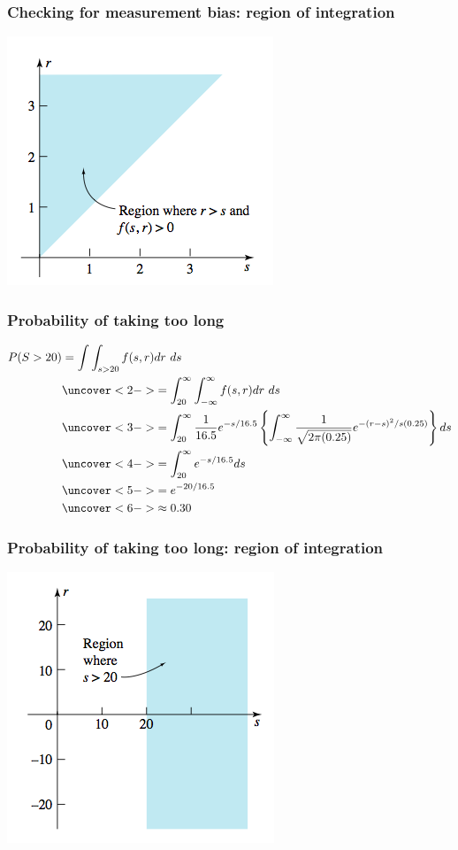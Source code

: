 \documentclass[handout]{beamer}\usepackage{graphicx, color}
\numberwithin{equation}{section}
\begin{document}
\begin{frame}
\frametitle{Checking for measurement bias: region of integration}
 \includegraphics{../../fig/intregion1.png}
\end{frame}

\begin{frame}
\frametitle{Probability of taking too long} \scriptsize
\begin{align*}
P(S > 20) &= \int \int_{s > 20} f(s, r) dr \ ds \\
&\uncover<2->{= \int_{20}^\infty \int_{-\infty}^\infty f(s, r) dr \ ds} \\
&\uncover<3->{=\int_{20}^\infty \frac{1}{16.5} e^{-s/16.5} \left \{\int_{-\infty}^\infty \frac{1}{\sqrt{2 \pi (0.25)}} e^{-(r-s)^2/s(0.25)} \right \} ds} \\
&\uncover<4->{=\int_{20}^\infty e^{-s/16.5} ds} \\
&\uncover<5->{=e^{-20/16.5}} \\
&\uncover<6->{\approx 0.30}
\end{align*}
\end{frame}

\begin{frame}
\frametitle{Probability of taking too long: region of integration}
 \includegraphics{../../fig/intregion2.png}
\end{frame}
\end{document}
